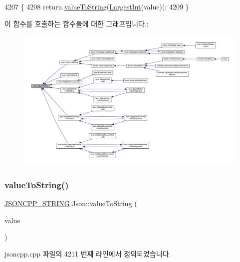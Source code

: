 \begin{DoxyCode}
4207                                         \{
4208   \textcolor{keywordflow}{return} \hyperlink{namespace_json_a498503e8f49d6a3811e3c9f6757da60d}{valueToString}(\hyperlink{namespace_json_a218d880af853ce786cd985e82571d297}{LargestInt}(value));
4209 \}
\end{DoxyCode}
이 함수를 호출하는 함수들에 대한 그래프입니다.\+:\nopagebreak
\begin{figure}[H]
\begin{center}
\leavevmode
\includegraphics[width=350pt]{namespace_json_a498503e8f49d6a3811e3c9f6757da60d_icgraph}
\end{center}
\end{figure}
\mbox{\label{namespace_json_ab2cb54f173193c8d27c3eb7f10b6e79a}} 
\subsubsection{\texorpdfstring{value\+To\+String()}{valueToString()}\hspace{0.1cm}{\footnotesize\ttfamily [2/6]}}
{\footnotesize\ttfamily \hyperlink{json_8h_a1e723f95759de062585bc4a8fd3fa4be}{J\+S\+O\+N\+C\+P\+P\+\_\+\+S\+T\+R\+I\+NG} Json\+::value\+To\+String (\begin{DoxyParamCaption}\item[{\hyperlink{namespace_json_a800fb90eb6ee8d5d62b600c06f87f7d4}{U\+Int}}]{value }\end{DoxyParamCaption})}



jsoncpp.\+cpp 파일의 4211 번째 라인에서 정의되었습니다.



